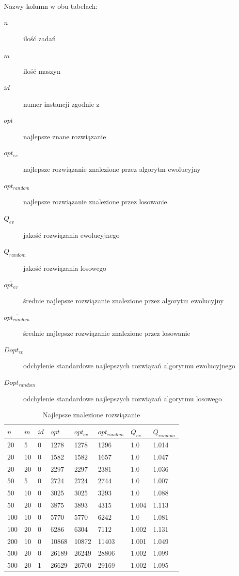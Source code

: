 \documentclass[11pt, a4wide]{article}
\begin{document}
Nazwy kolumn w obu tabelach:
\begin{description}
  \item[$n$] ilość zadań 
  \item[$m$] ilość maszyn 
  \item[$id$] numer instancji zgodnie z \cite{inst}
  \item[$opt$] najlepsze znane rozwiązanie
  \item[$opt_{ev}$] najlepsze rozwiązanie znalezione przez algorytm ewolucyjny
  \item[$opt_{random}$] najlepsze rozwiązanie znalezione przez losowanie
  \item[$Q_{ev}$] jakość rozwiązania ewolucyjnego 
  \item[$Q_{random}$] jakość rozwiązania losowego

  \item[$\overline{opt_{ev}}$] średnie najlepsze rozwiązanie znalezione przez algorytm ewolucyjny
  \item[$\overline{opt_{random}}$] średnie najlepsze rozwiązanie znalezione przez losowanie
  \item[$Dopt_{ev}$] odchylenie standardowe najlepszych rozwiązań algorytmu ewolucyjnego
  \item[$Dopt_{random}$] odchylenie standardowe najlepszych rozwiązań algorytmu losowego
\end{description}


\begin{table}[H]
\caption{Najlepsze znalezione rozwiązanie}
\label{best}
\begin{center}
\begin{tabular}{|l|l|l|l||l|l||l|l|}
  \hline
  $n$ & $m$ & $id$ & $opt$ & $opt_{ev}$ & $opt_{random}$ & $Q_{ev}$ & $Q_{random}$ \\
  \hline
  20 & 5 & 0 & 1278 & 1278 & 1296 & 1.0 & 1.014 \\
  20 & 10 & 0 & 1582 & 1582 & 1657 & 1.0 & 1.047 \\
  20 & 20 & 0 & 2297 & 2297 & 2381 & 1.0 & 1.036 \\
  50 & 5 & 0 & 2724 & 2724 & 2744 & 1.0 & 1.007 \\
  50 & 10 & 0 & 3025 & 3025 & 3293 & 1.0 & 1.088 \\
  50 & 20 & 0 & 3875 & 3893 & 4315 & 1.004 & 1.113 \\
  100 & 10 & 0 & 5770 & 5770 & 6242 & 1.0 & 1.081 \\
  100 & 20 & 0 & 6286 & 6304 & 7112 & 1.002 & 1.131 \\
  200 & 10 & 0 & 10868 & 10872 & 11403 & 1.001 & 1.049 \\
  500 & 20 & 0 & 26189 & 26249 & 28806 & 1.002 & 1.099 \\
  500 & 20 & 1 & 26629 & 26700 & 29169 & 1.002 & 1.095 \\
  \hline
\end{tabular}
\end{center}
\end{table}
\end{document}
